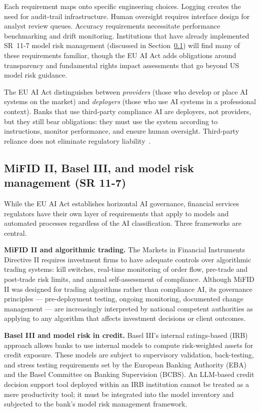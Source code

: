 Each requirement maps onto specific engineering choices. Logging creates the need for audit-trail infrastructure. Human oversight requires interface design for analyst review queues. Accuracy requirements necessitate performance benchmarking and drift monitoring. Institutions that have already implemented SR~11-7 model risk management (discussed in Section~\ref{sec:ch11-mifid-basel}) will find many of these requirements familiar, though the EU AI Act adds obligations around transparency and fundamental rights impact assessments that go beyond US model risk guidance.

\begin{remark}
The EU AI Act distinguishes between \emph{providers} (those who develop or place AI systems on the market) and \emph{deployers} (those who use AI systems in a professional context). Banks that use third-party compliance AI are deployers, not providers, but they still bear obligations: they must use the system according to instructions, monitor performance, and ensure human oversight. Third-party reliance does not eliminate regulatory liability~\cite{euaiact2024}.
\end{remark}

\subsection{MiFID II, Basel III, and model risk management (SR 11-7)}
\label{sec:ch11-mifid-basel}

While the EU AI Act establishes horizontal AI governance, financial services regulators have their own layer of requirements that apply to models and automated processes regardless of the AI classification. Three frameworks are central.

\textbf{MiFID II and algorithmic trading.} The Markets in Financial Instruments Directive II requires investment firms to have adequate controls over algorithmic trading systems: kill switches, real-time monitoring of order flow, pre-trade and post-trade risk limits, and annual self-assessment of compliance. Although MiFID II was designed for trading algorithms rather than compliance AI, its governance principles --- pre-deployment testing, ongoing monitoring, documented change management --- are increasingly interpreted by national competent authorities as applying to any algorithm that affects investment decisions or client outcomes.

\textbf{Basel III and model risk in credit.} Basel III's internal ratings-based (IRB) approach allows banks to use internal models to compute risk-weighted assets for credit exposure. These models are subject to supervisory validation, back-testing, and stress testing requirements set by the European Banking Authority (EBA) and the Basel Committee on Banking Supervision (BCBS). An LLM-based credit decision support tool deployed within an IRB institution cannot be treated as a mere productivity tool; it must be integrated into the model inventory and subjected to the bank's model risk management framework.

